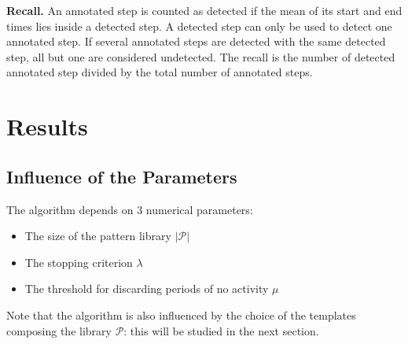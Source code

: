 \documentclass[../thesis.tex]{subfiles}
\begin{document}
\textbf{Recall.} An annotated step is counted as detected if the mean of its start and end times lies inside a detected step. A detected step can only be used to detect one annotated step. If several annotated steps are detected with the same detected step, all but one are considered undetected. The recall is the number of  detected annotated step divided by the total number of annotated steps.









\section{Results}
\label{sec:walk_sd:results}



\subsection{Influence of the Parameters}
\label{sub:walk_sd:param}



The algorithm depends on 3 numerical parameters:
\begin{itemize}
 \item  The size of the pattern library  $|\mathcal{P}|$
\item The stopping criterion $\lambda$
\item The threshold for discarding  periods of no activity $\mu$
\end{itemize}
Note that  the algorithm is also influenced by the choice of the templates composing the library $\mathcal{P}$: this will be studied in the next section.
\end{document}
